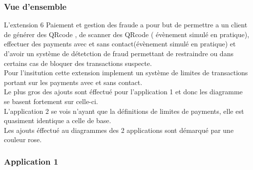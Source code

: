 \documentclass[../rapport.tex]{subfiles}
\begin{document}
		\subsubsection{Vue d'ensemble}
		L'extension 6 Paiement et gestion des fraude a pour but de permettre a un client de générer des QRcode , de scanner des QRcode ( évènement simulé en pratique),\\
        effectuer des payments avec et sans contact(évènement simulé en pratique) et d'avoir un système de détetction de fraud permettant de restraindre ou dans certains cas de bloquer des transactions suspecte.\\
        Pour l'insitution cette extension implement un système de limites de transactions portant sur les payments avec et sans contact.\\
        Le plus gros des ajouts sont éffectué pour l'application 1 et donc les diagramme se basent fortement sur celle-ci.\\
        L'application 2 se vois n'ayant que la définitions de limites de payments, elle est quasiment identique a celle de base.\\
        Les ajouts éffectué au diagrammes des 2 applications sont démarqué par une couleur rose.\\

		\subsubsection{Application 1}
\end{document}
